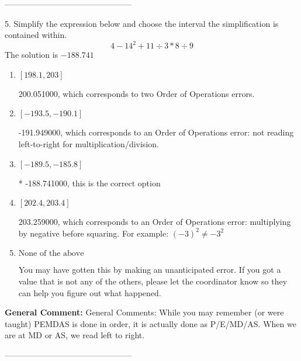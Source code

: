 \documentclass{extbook}[14pt]
\begin{document}
-----------------------------------------------

5. Simplify the expression below and choose the interval the simplification is contained within.
\[ 4 - 14^2 + 11 \div 3 * 8 \div 9 \] 
The solution is $ -188.741 $ 

\begin{enumerate}[label=\Alph*.] 
\item $ [198.1, 203] $ 

  200.051000, which corresponds to two Order of Operations errors. 
\item $ [-193.5, -190.1] $ 

  -191.949000, which corresponds to an Order of Operations error: not reading left-to-right for multiplication/division. 
\item $ [-189.5, -185.8] $ 

 * -188.741000, this is the correct option 
\item $ [202.4, 203.4] $ 

  203.259000, which corresponds to an Order of Operations error: multiplying by negative before squaring. For example: $(-3)^2 \neq -3^2$ 
\item $ \text{None of the above} $ 

  You may have gotten this by making an unanticipated error. If you got a value that is not any of the others, please let the coordinator know so they can help you figure out what happened. 
\end{enumerate} 
 
\textbf{General Comment:} General Comments: While you may remember (or were taught) PEMDAS is done in order, it is actually done as P/E/MD/AS. When we are at MD or AS, we read left to right. 

-----------------------------------------------
\end{document}
